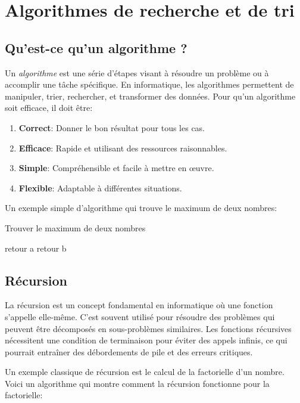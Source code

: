 \chapter{Algorithmes de recherche et de tri}

\section{Qu’est-ce qu’un algorithme ?}

Un \emph{algorithme} est une série d'étapes visant à résoudre un problème ou à accomplir une tâche spécifique. En informatique, les algorithmes permettent de manipuler, trier, rechercher, et transformer des données. Pour qu'un algorithme soit efficace, il doit être:

\begin{enumerate}
	\item \textbf{Correct}: Donner le bon résultat pour tous les cas.
	\item \textbf{Efficace}: Rapide et utilisant des ressources raisonnables.
	\item \textbf{Simple}: Compréhensible et facile à mettre en œuvre.
	\item \textbf{Flexible}: Adaptable à différentes situations.
\end{enumerate}

Un exemple simple d'algorithme qui trouve le maximum de deux nombres:

\begin{algorithm}
	\caption{Trouver le maximum de deux nombres}
	\begin{algorithmic}
		\State retour a
		\Else
		\State retour b
		\EndIf
	\end{algorithmic}
\end{algorithm}

\section{Récursion}

La récursion est un concept fondamental en informatique où une fonction s'appelle elle-même. C'est souvent utilisé pour résoudre des problèmes qui peuvent être décomposés en sous-problèmes similaires. Les fonctions récursives nécessitent une condition de terminaison pour éviter des appels infinis, ce qui pourrait entraîner des débordements de pile et des erreurs critiques.

Un exemple classique de récursion est le calcul de la factorielle d'un nombre. Voici un algorithme qui montre comment la récursion fonctionne pour la factorielle:

